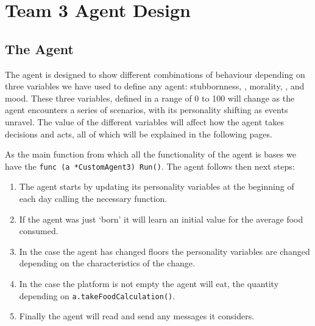 \chapter{Team 3 Agent Design}\label{team_3_agent_design}

\section{The Agent}\label{the_agent}
The agent is designed to show different combinations of behaviour depending on three variables we have used to define any agent: stubbornness, \cite{chun_2005},  morality, \cite{waller_2015}, and mood. These three variables, defined in a range of 0 to 100 will change as the agent encounters a series of scenarios, with its personality shifting as events unravel.  The value of the different variables will affect how the agent takes decisions and acts, all of which will be explained in the following pages. \par
As the main function from which all the functionality of the agent is bases we have the \texttt{func (a *CustomAgent3) Run()}. The agent follows then next steps:
\begin{enumerate}
    \item The agent starts by updating its personality variables at the beginning of each day calling the necessary function. 
    \item If the agent was just ‘born’ it will learn an initial value for the average food consumed. 
    \item In the case the agent has changed floors the personality variables are changed depending on the characteristics of the change. 
    \item In the case the platform is not empty the agent will eat, the quantity depending on \texttt{a.takeFoodCalculation()}.
    \item Finally the agent will read and send any messages it considers.
\end{enumerate}

